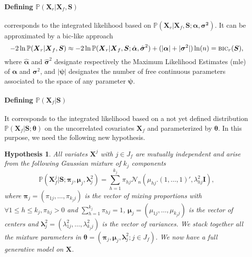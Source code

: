 \documentclass[12pt,a4paper]{report}
\newtheorem{hyp}{Hypothesis}
\begin{document}
\paragraph{Defining $\mathbb{P}(\boldsymbol{X}_r|\boldsymbol{X}_f,\boldsymbol{S})$} corresponds to the integrated likelihood based on $\mathbb{P}(\boldsymbol{X}_r | \boldsymbol{X}_f,\boldsymbol{S};\boldsymbol{\alpha},\boldsymbol{\sigma^2})$. It can be approximated by a {\sc bic}-like approach \cite{Sch1978}
\begin{equation}
-2\ln \mathbb{P}(\boldsymbol{X}_r|\boldsymbol{X}_f,\boldsymbol{S}) \approx -2\ln \mathbb{P}(\boldsymbol{X}_r | \boldsymbol{X}_f,\boldsymbol{S};\hat{\boldsymbol{\alpha}},\hat{\boldsymbol{\sigma}}^2) + (|{\boldsymbol{\alpha}}| + |{\boldsymbol{\sigma}}^2|) \ln(n) = \mbox{{\sc bic}}_r(\boldsymbol{S}),
\end{equation}
where $\hat{\boldsymbol{\alpha}}$ and $\hat{\boldsymbol{\sigma}}^2$ designate respectively the Maximum Likelihood Estimates ({\sc mle}) of ${\boldsymbol{\alpha}}$ and ${\boldsymbol{\sigma}}^2$, and $|\boldsymbol{\psi}|$ designates the number of free continuous parameters associated to the space of any parameter $\boldsymbol{\psi}$.

\paragraph{Defining $\mathbb{P}(\boldsymbol{X}_f|\boldsymbol{S})$} It corresponds to the integrated likelihood based on a not yet defined distribution $\mathbb{P}(\boldsymbol{X}_f|\boldsymbol{S};\boldsymbol{\theta})$ on the uncorrelated covariates $\boldsymbol{X}_f$ and parameterized by $\boldsymbol{\theta}$. In this purpose, we need the following new hypothesis.

\begin{hyp}\label{H4}
All variates $\boldsymbol{X}^j$ with $j \in J_f$ are mutually independent and arise from the following Gaussian mixture of $k_j$ components
\begin{equation}
\mathbb{P}(\boldsymbol{X}_f^j|\boldsymbol{S};\boldsymbol{\pi}_{j},\boldsymbol{\mu}_j,\boldsymbol{\lambda}^2_j) = \sum_{h=1}^{k_j} \pi_{hj} \mathcal{N}_n(\mu_{hj} . (1,\ldots,1)',\lambda_{hj}^2\boldsymbol{I}),
\end{equation}
where $\boldsymbol{\pi}_{j}=(\pi_{1j},\ldots,\pi_{k_jj})$ is the vector of mixing proportions with $\forall 1\leq h\leq k_j , \pi_{hj}>0$ and $\sum_{h=1}^{k_j}\pi_{hj}=1$, $\boldsymbol{\mu}_j=(\mu_{1j},\ldots,\mu_{k_jj})$  is the vector of centers and $\boldsymbol{\lambda}^2_j=(\lambda^2_{1j},\ldots,\lambda^2_{k_jj})$ is the vector of variances. We stack together all the mixture parameters in $\boldsymbol{\theta}=(\boldsymbol{\pi}_{j},\boldsymbol{\mu}_j,\boldsymbol{\lambda}^2_j ; j \in J_f)$. We now have a full generative model on $\boldsymbol{X}$.

\end{hyp}
		 
\end{document}
